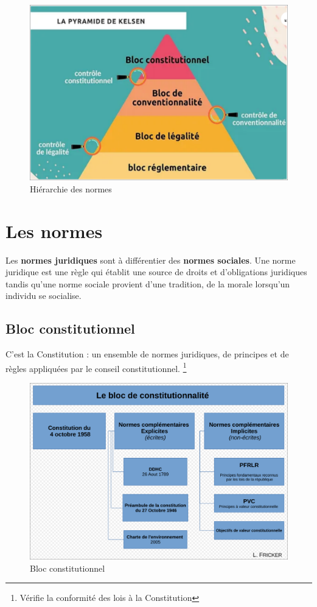 \begin{center}
    \begin{figure}[hbt!]
        \includegraphics[scale=0.4]{Pics/Pyramide_de_Kelsen.png}
        \caption{Hiérarchie des normes}
    \end{figure}
\end{center}
\newpage
\section{Les normes}
Les \textbf{normes juridiques} sont à différentier des \textbf{normes sociales}. Une norme juridique est une règle qui établit une source de droits et d'obligations juridiques tandis
qu'une norme sociale provient d'une tradition, de la morale lorsqu'un individu se socialise. 
\subsection{Bloc constitutionnel}
C'est la Constitution : un ensemble de normes juridiques, de principes et de règles appliquées par le conseil constitutionnel. \footnote{Vérifie la conformité des lois à la Constitution}
\begin{center}
    \begin{figure}[hbt!]
        \includegraphics[scale=0.3]{Pics/Bloc_de_constitutionnalite.png}
        \caption{Bloc constitutionnel}
    \end{figure}
\end{center}
\newpage
